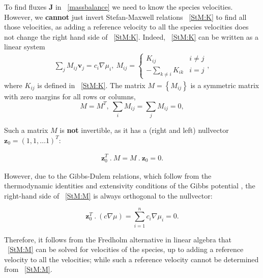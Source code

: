\documentclass[../main.tex]{subfiles}
\begin{document}
To find fluxes $\mathbf{J}$ in ~\ref{massbalance} we need to know the species velocities. However, we {\bf cannot} just invert Stefan-Maxwell relations ~\ref{StM:K} to find all those velocities, as adding
a reference velocity to all the species velocities does not change the right hand side of ~\ref{StM:K}.
Indeed, ~\ref{StM:K} can be written as a linear system
\begin{equation} \begin{array}{l}
    \displaystyle \sum_{j }  M_{ij}  \mathbf{v}_j  = c_i \nabla \mu_i , \
    M_{ij}= \left\{  \begin{array}{rl}  K_{ij} & i\neq j \\ -  \displaystyle \sum_{k\neq i} K_{ik} & i = j\end{array} \right. ,
    \label{StM:M}
\end{array} \end{equation}
\noindent where $K_{ij}$ is defined in ~\ref{StM:K}. The matrix $M = \left\{ M_{ij} \right\}$ is a symmetric matrix with zero margins for all rows or columns,
$$
M= M^T, \  \displaystyle  \sum_{i} M_{ij} = \sum_{j } M_{ij} = 0,
$$

\noindent Such a matrix $M$ is \textbf{not} invertible, as it has a (right and left) nullvector $\mathbf{z}_0= (1,1, \ldots 1)^{T}:$

\begin{equation} \begin{array}{l}
    \displaystyle  \mathbf{z}_0^{T}   \ . \  M = M \ . \ \mathbf{z}_0 = 0.
\end{array} \end{equation}


However, due to the Gibbs-Dulem relations, which follow from the thermodynamic identities and extensivity conditions of the Gibbs potential \cite{GoyalMonroe}, the right-hand side of ~\ref{StM:M} is always orthogonal to the nullvector:

\begin{equation}
 \mathbf{z}_0^{T}   \ . \ \left( c  \nabla \mu \right) =   \sum_{i=1}^n c_i \nabla \mu_i = 0.
 \label{GibbsDu}
\end{equation}

Therefore, it follows from the Fredholm alternative in linear algebra that ~\ref{StM:M} can be solved for velocities of the species, up to adding a reference velocity to all the velocities; while such a reference velocity cannot be determined from ~\ref{StM:M}.
\end{document}
